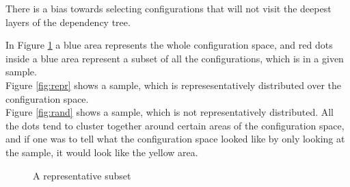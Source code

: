 \documentclass[a4paper,11pt]{report}
\newcommand{\figa}{
    \begin{figure}[!htpb]
    \centering
}
\newcommand{\figb}[2]{
    \caption{#1}
    \label{#2}
    \end{figure}
}
\begin{document}
There is a bias towards selecting configurations that will not visit the 
deepest layers of the dependency tree.

In Figure \ref{fig:reprrand} a blue area represents the whole configuration 
space, and red dots inside a blue area represent a subset of all the 
configurations, which is in a given sample.
\\

Figure \ref{fig:repr} shows a sample, which is represesentatively distributed 
over the configuration space. 
\\

Figure \ref{fig:rand} shows a sample, which is not representatively 
distributed. All the dots tend to cluster together around certain areas of the 
configuration space, and if one was to tell what the configuration space looked 
like by only looking at the sample, it would look like the yellow area.

\figa
\figb{A representative subset}{fig:reprrand}
\end{document}
